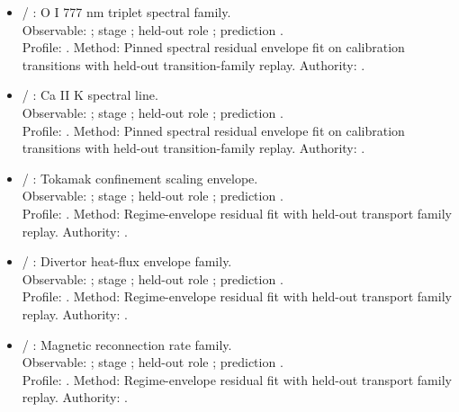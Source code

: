 \begin{itemize}
\item {} / : O I 777 nm triplet spectral family.\\ Observable: ; stage ; held-out role ; prediction .\\ Profile: . Method: Pinned spectral residual envelope fit on calibration transitions with held-out transition-family replay. Authority: .
\item {} / : Ca II K spectral line.\\ Observable: ; stage ; held-out role ; prediction .\\ Profile: . Method: Pinned spectral residual envelope fit on calibration transitions with held-out transition-family replay. Authority: .
\item {} / : Tokamak confinement scaling envelope.\\ Observable: ; stage ; held-out role ; prediction .\\ Profile: . Method: Regime-envelope residual fit with held-out transport family replay. Authority: .
\item {} / : Divertor heat-flux envelope family.\\ Observable: ; stage ; held-out role ; prediction .\\ Profile: . Method: Regime-envelope residual fit with held-out transport family replay. Authority: .
\item {} / : Magnetic reconnection rate family.\\ Observable: ; stage ; held-out role ; prediction .\\ Profile: . Method: Regime-envelope residual fit with held-out transport family replay. Authority: .

\end{itemize}
